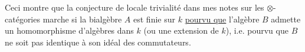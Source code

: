 Ceci montre que la conjecture de locale trivialité  dans mes notes sur les $\otimes$-catégories marche si la bialgèbre $A$  est finie sur $k$ \uline{pourvu que} l'algèbre $B$ admette un homomorphisme d'algèbres dans $k$ (ou une extension de $k$), i.e. pourvu que $B$ ne soit pas identique à son idéal des commutateurs.
